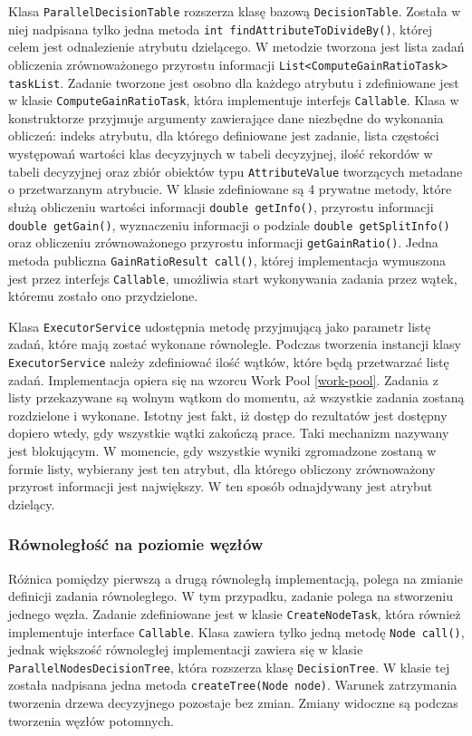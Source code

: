 \documentclass[12pt]{article}
\begin{document}
Klasa \verb|ParallelDecisionTable| rozszerza klasę bazową \verb|DecisionTable|.
Została w niej nadpisana tylko jedna metoda \verb|int findAttributeToDivideBy()|, której celem jest odnalezienie atrybutu dzielącego.
W metodzie tworzona jest lista zadań obliczenia zrównoważonego przyrostu informacji \verb|List<ComputeGainRatioTask> taskList|.
Zadanie tworzone jest osobno dla każdego atrybutu i zdefiniowane jest w klasie \verb|ComputeGainRatioTask|, która implementuje interfejs \verb|Callable|.
Klasa w konstruktorze przyjmuje argumenty zawierające dane niezbędne do wykonania obliczeń:
indeks atrybutu, dla którego definiowane jest zadanie, lista częstości występowań
wartości klas decyzyjnych w tabeli decyzyjnej, ilość rekordów w tabeli decyzyjnej oraz zbiór obiektów typu \verb|AttributeValue|
tworzących metadane o przetwarzanym atrybucie. W klasie zdefiniowane są 4 prywatne metody, które służą obliczeniu wartości informacji \verb|double getInfo()|,
przyrostu informacji \verb|double getGain()|, wyznaczeniu informacji o podziale \verb|double getSplitInfo()|
oraz obliczeniu zrównoważonego przyrostu informacji \verb|getGainRatio()|. Jedna metoda publiczna \verb|GainRatioResult call()|, której
implementacja wymuszona jest przez interfejs \verb|Callable|, umożliwia start wykonywania zadania przez wątek, któremu zostało ono przydzielone.

Klasa \verb|ExecutorService| udostępnia metodę przyjmującą jako parametr listę zadań, które mają zostać wykonane równolegle. Podczas tworzenia instancji
klasy \verb|ExecutorService| należy zdefiniować ilość wątków, które będą przetwarzać listę zadań. Implementacja opiera się na wzorcu Work Pool \ref{work-pool}.
Zadania z listy przekazywane są wolnym wątkom do momentu, aż wszystkie zadania zostaną rozdzielone i wykonane. Istotny jest fakt, iż dostęp do rezultatów
jest dostępny dopiero wtedy, gdy wszystkie wątki zakończą prace. Taki mechanizm nazywany jest blokującym. W momencie, gdy wszystkie wyniki zgromadzone
zostaną w formie listy, wybierany jest ten atrybut, dla którego obliczony zrównoważony przyrost informacji jest największy. W ten sposób odnajdywany jest atrybut dzielący.

\subsubsection{Równoległość na poziomie węzłów}

Różnica pomiędzy pierwszą a drugą równoległą implementacją, polega na zmianie definicji zadania równoległego. W tym przypadku, zadanie polega na stworzeniu jednego
węzła. Zadanie zdefiniowane jest w klasie \verb|CreateNodeTask|, która również implementuje interface \verb|Callable|. Klasa zawiera tylko jedną metodę
\verb|Node call()|, jednak większość równoległej implementacji zawiera się w klasie \verb|ParallelNodesDecisionTree|, która rozszerza klasę \verb|DecisionTree|.
W klasie tej została nadpisana jedna metoda \verb|createTree(Node node)|. Warunek zatrzymania tworzenia drzewa decyzyjnego pozostaje bez zmian. Zmiany widoczne są
podczas tworzenia węzłów potomnych.
\end{document}

